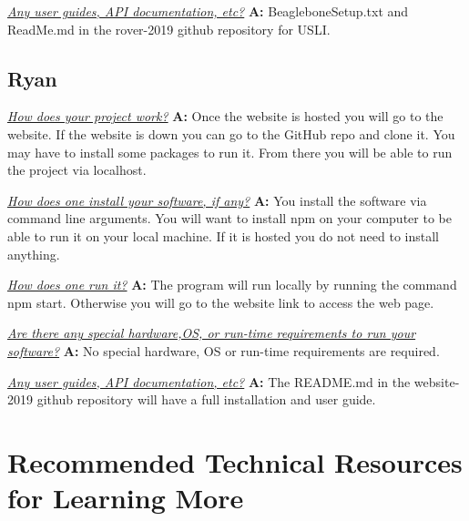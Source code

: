 \documentclass[onecolumn, draftclsnofoot, 10pt, compsoc]{IEEEtran}
\begin{document}
\textit{\underline{Any user guides, API documentation, etc?}}
\newline\textbf{A:} BeagleboneSetup.txt and ReadMe.md in the rover-2019 github repository for USLI.

\subsection{Ryan}
\textit{\underline{How does your project work?}}
\newline\textbf{A:} Once the website is hosted you will go to the website. If the website is down you can go to the GitHub repo and clone it. You may have to install some packages to run it. From there you will be able to run the project via localhost. \newline

\textit{\underline{How does one install your software, if any?}}
\newline\textbf{A:} You install the software via command line arguments. You will want to install npm on your computer to be able to run it on your local machine. If it is hosted you do not need to install anything. \newline

\textit{\underline{How does one run it?}}
\newline\textbf{A:} The program will run locally by running the command npm start. Otherwise you will go to the website link to access the web page. \newline 

\textit{\underline{Are there any special hardware,OS, or run-time requirements to run your software?}}
\newline\textbf{A:} No special hardware, OS or run-time requirements are required. \newline 

\textit{\underline{Any user guides, API documentation, etc?}}
\newline\textbf{A:} The README.md in the website-2019 github repository will have a full installation and user guide. 

\section{Recommended Technical Resources for Learning More}
\end{document}
